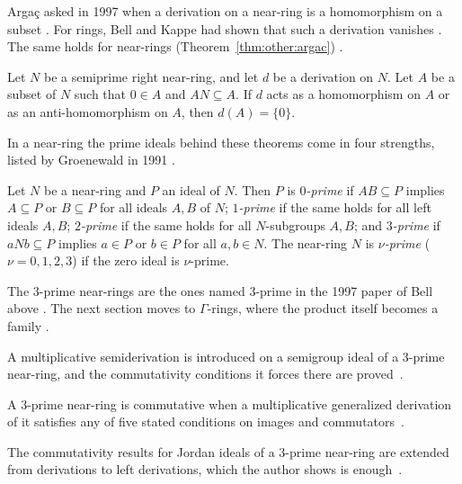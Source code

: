 Arga\c{c} asked in 1997 when a derivation on a near-ring is a homomorphism
on a subset \cite[p.~737]{Argac1997}. For rings, Bell and Kappe had shown
that such a derivation
vanishes \cite[p.~737]{Argac1997}. The same holds for near-rings (Theorem~\ref{thm:other:argac})
\cite[p.~737]{Argac1997}.\begin{theorem}\label{thm:other:argac}
Let $N$ be a semiprime right near-ring, and let $d$ be a derivation on $N$.
Let $A$ be a subset of $N$ such that $0 \in A$ and $A N \subseteq A$. If $d$
acts as a homomorphism on $A$ or as an anti-homomorphism on $A$, then
$d(A) = \{0\}$.
\end{theorem}

In a near-ring the prime ideals behind these theorems come in four
strengths, listed by Groenewald in 1991
\cite[Definition~1, p.~2669]{Groenewald1991}.

\begin{definition}\label{def:other:prime-ideals}
Let $N$ be a near-ring and $P$ an ideal of $N$. Then $P$ is
\emph{$0$-prime} if $A B \subseteq P$ implies $A \subseteq P$ or
$B \subseteq P$ for all ideals $A, B$ of $N$; \emph{$1$-prime} if the same
holds for all left ideals $A, B$; \emph{$2$-prime} if the same holds for
all $N$-subgroups $A, B$; and \emph{$3$-prime} if $a N b \subseteq P$
implies $a \in P$ or $b \in P$ for all $a, b \in N$. The near-ring $N$ is
\emph{$\nu$-prime} ($\nu = 0, 1, 2, 3$) if the zero ideal is $\nu$-prime.
\end{definition}

The $3$-prime near-rings are the ones named 3-prime in the 1997 paper of
Bell above \cite[p.~191]{Bell1997II}. The next section moves to
$\Gamma$-rings, where the product itself becomes a family
\cite[p.~2]{DeyPaulRakhimov2012}.

A multiplicative semiderivation is introduced on a semigroup ideal of a
3-prime near-ring, and the commutativity conditions it forces there are
proved~\cite{WlSemigroupIdealsWith2022}.

A 3-prime near-ring is commutative when a multiplicative generalized
derivation of it satisfies any of five stated conditions on images and
commutators~\cite{WlOnCommutativityOf2019}.

The commutativity results for Jordan ideals of a 3-prime near-ring are
extended from derivations to left derivations, which the author shows is
enough~\cite{WlOnJordanIdeals2023}.

